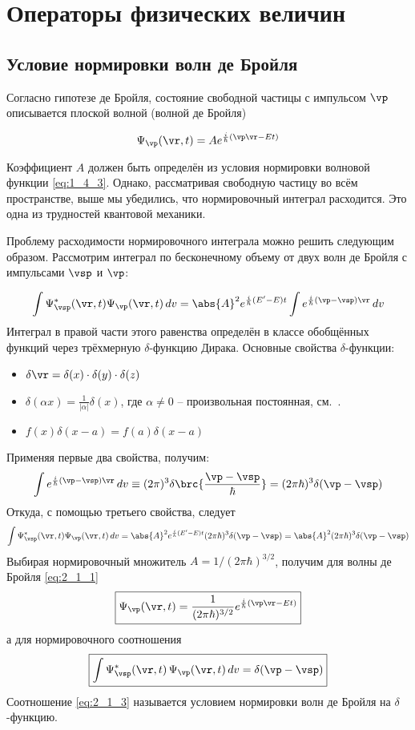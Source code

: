 \chapter{Операторы физических величин}

\section{Условие нормировки волн де Бройля}

Согласно гипотезе де Бройля, состояние свободной частицы с импульсом $\vp$ описывается плоской волной (волной де Бройля)

\begin{equation}
\label{eq:2_1_1}
\Psi_{\vp}(\vr,t) = A e^{\frac{i}{\hbar}(\vp\vr-Et)}
\end{equation}


Коэффициент $A$ должен быть определён из условия нормировки волновой функции \eqref{eq:1_4_3}. Однако, рассматривая свободную частицу во всём пространстве, выше мы убедились, что нормировочный интеграл расходится. Это одна из трудностей квантовой механики.

Проблему расходимости нормировочного интеграла можно решить следующим образом. Рассмотрим интеграл по бесконечному объему от двух волн де Бройля с импульсами $\vsp$ и $\vp$:

$$
\int \Psi^*_{\vsp}(\vr,t) \Psi_{\vp}(\vr,t) \, dv = 
  \abs{A}^2 e^{\frac{i}{\hbar}(E' - E)t} \int e^{\frac{i}{\hbar}(\vp - \vsp)\vr} \, dv
$$%
%
Интеграл в правой части этого равенства определён в классе обобщённых функций через трёхмерную $\delta$-функцию Дирака. Основные свойства $\delta$-функции:
\begin{itemize}
\item $\delta {\vr} = \delta (x) \cdot \delta (y) \cdot \delta (z) $
\item $\delta (\alpha x) = \frac{1}{|\alpha|} \delta (x)$, где $\alpha \ne 0$ -- произвольная постоянная, см.~.
\item $f(x) \delta (x - a) = f(a) \delta(x-a)$
\end{itemize}%
%
Применяя первые два свойства, получим:
$$
\int e^{\frac{i}{\hbar}(\vp - \vsp)\vr} \, dv \equiv
  (2 \pi )^3 \delta \brc{\frac{\vp - \vsp}{\hbar}} =
  (2 \pi \hbar)^3 \delta (\vp - \vsp)
$$%
%
Откуда, с помощью третьего свойства, следует
$$
\int \Psi^*_{\vsp}(\vr,t) \Psi_{\vp}(\vr,t) \, dv = 
  \abs{A}^2 e^{\frac{i}{\hbar}(E' - E)t} (2 \pi \hbar)^3 \delta (\vp - \vsp) =
  \abs{A}^2 (2 \pi \hbar)^3 \delta (\vp - \vsp)
$$%
%
Выбирая нормировочный множитель $A = 1/(2 \pi \hbar)^{3/2}$, получим для волны де Бройля \eqref{eq:2_1_1}%
%
\begin{equation}
\label{eq:2_1_2}
\boxed{\Psi_{\vp}(\vr,t) = \frac{1}{(2 \pi \hbar)^{3/2}} e^{\frac{i}{\hbar} (\vp \vr - Et)}}
\end{equation}%
%
а для нормировочного соотношения
\begin{equation}
\label{eq:2_1_3}
\boxed{\int\Psi^*_{\vsp}(\vr,t) \, \Psi_{\vp}(\vr,t) \, dv = \delta (\vp - \vsp)}
\end{equation}%
%
Соотношение \eqref{eq:2_1_3} называется условием нормировки волн де Бройля на $\delta$-функцию.

